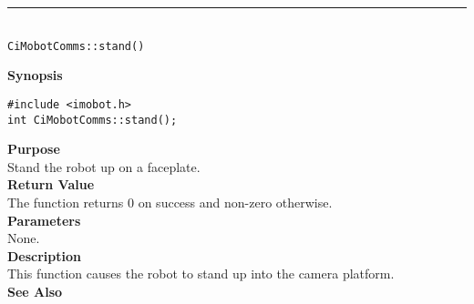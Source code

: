 \noindent
\vspace{5pt}
\rule{4.5in}{0.015in}\\
\noindent
{\LARGE \texttt{CiMobotComms::stand()}}\\
{}

\noindent
{\bf Synopsis}\\
\begin{verbatim}
#include <imobot.h>
int CiMobotComms::stand();
\end{verbatim}

\noindent
{\bf Purpose}\\
Stand the robot up on a faceplate.\\

\noindent
{\bf Return Value}\\
The function returns 0 on success and non-zero otherwise.\\

\noindent
{\bf Parameters}\\
None.\\

\noindent
{\bf Description}\\
This function causes the robot to stand up into the camera platform.\\

\noindent
{\bf See Also}\\

